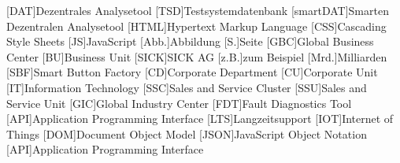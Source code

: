 \begin{acronym}[AAAAAA]
    [DAT]{Dezentrales Analysetool}
    [TSD]{Testsystemdatenbank}
    [smartDAT]{Smarten Dezentralen Analysetool}
    [HTML]{Hypertext Markup Language}
    [CSS]{Cascading Style Sheets}
    [JS]{JavaScript}
    [Abb.]{Abbildung}
    [S.]{Seite}
    [GBC]{Global Business Center}
    [BU]{Business Unit}
    [SICK]{SICK AG}
    [z.B.]{zum Beispiel}
    [Mrd.]{Milliarden}
    [SBF]{Smart Button Factory}
    [CD]{Corporate Department}
    [CU]{Corporate Unit}
    [IT]{Information Technology}
    [SSC]{Sales and Service Cluster}
    [SSU]{Sales and Service Unit}
    [GIC]{Global Industry Center}
    [FDT]{Fault Diagnostics Tool}
    [API]{Application Programming Interface}
    [LTS]{Langzeitsupport}
    [IOT]{Internet of Things}
    [DOM]{Document Object Model}
    [JSON]{JavaScript Object Notation}
    [API]{Application Programming Interface}

\end{acronym}